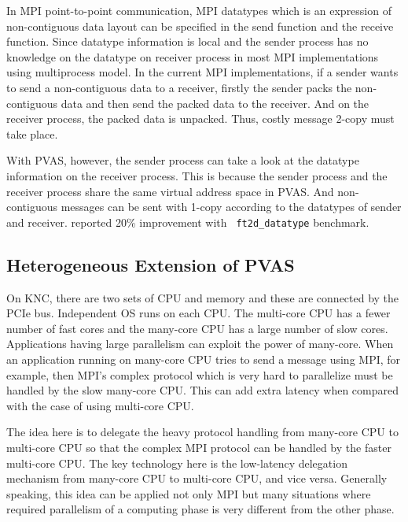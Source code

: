 In MPI point-to-point communication, MPI datatypes which is an
expression of non-contiguous data layout can be specified in
the send function and the receive function. Since datatype information
is local and the sender process has no knowledge on the datatype on receiver
process in most MPI implementations using multiprocess model. In the
current MPI implementations, if a sender 
wants to send a non-contiguous data to a receiver, firstly the sender
packs the non-contiguous data and then send the packed data to the
receiver. And on the receiver process, the packed data is
unpacked. Thus, costly message 2-copy must take place.

With PVAS, however, the sender process can take a look at the datatype
information on the receiver process. This is because the sender 
process and the receiver process share the same virtual address space in
PVAS. And non-contiguous messages can be sent with
1-copy according to the datatypes of sender and
receiver. \cite{shimada-thesis} reported 20\% improvement with {\tt 
ft2d\_datatype} benchmark\cite{mpi-ddt-benchmark}.  

\subsection{Heterogeneous Extension of PVAS}\label{sec:mpvas}

On KNC, there are two sets of CPU and memory and these are connected
by the PCIe bus. Independent OS runs on each CPU. The multi-core CPU
has a fewer number of fast cores and the many-core CPU has a large
number of slow cores. Applications having large parallelism can
exploit the power of many-core. When an application running on
many-core CPU tries to send a message using MPI, for example, then MPI's
complex protocol which is very hard to parallelize must be
handled by the slow many-core CPU. This can add extra latency when
compared with the case of using multi-core CPU.

The idea here is to delegate the heavy protocol handling from
many-core CPU to multi-core CPU so that the complex MPI protocol can
be handled by the faster multi-core CPU. The key technology here is
the low-latency delegation mechanism from many-core CPU to multi-core 
CPU, and vice versa. Generally speaking, this idea can be applied not
only MPI but many situations where required parallelism of a
computing phase is very different from the other phase.

